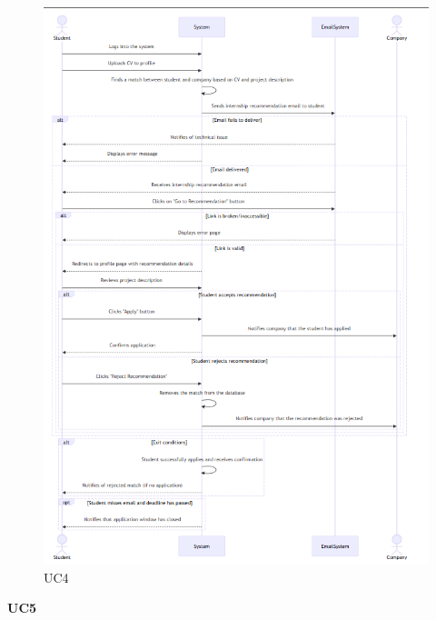\begin{figure}[H]
    \centering
    \includegraphics[width=0.5\linewidth]{RASD//Images/UC4.png}
    \caption{UC4}
\end{figure}

\pagebreak
\textbf{UC5}

